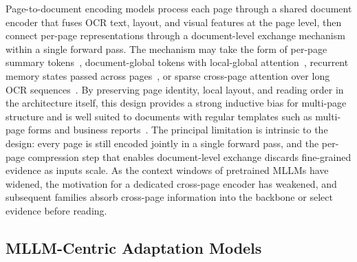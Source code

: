 \documentclass[11pt]{article}
\begin{document}
Page-to-document encoding models process each page through a shared document encoder that fuses OCR text, layout, and visual features at the page level, then connect per-page representations through a document-level exchange mechanism within a single forward pass. The mechanism may take the form of per-page summary tokens~\cite{tito2023hierarchical}, document-global tokens with local-global attention~\cite{blau2024gram}, recurrent memory states passed across pages~\cite{dong2024multipage}, or sparse cross-page attention over long OCR sequences~\cite{borchmann2025arctictilt}. By preserving page identity, local layout, and reading order in the architecture itself, this design provides a strong inductive bias for multi-page structure and is well suited to documents with regular templates such as multi-page forms and business reports~\cite{tito2023hierarchical,borchmann2025arctictilt}. The principal limitation is intrinsic to the design: every page is still encoded jointly in a single forward pass, and the per-page compression step that enables document-level exchange discards fine-grained evidence as inputs scale. As the context windows of pretrained MLLMs have widened, the motivation for a dedicated cross-page encoder has weakened, and subsequent families absorb cross-page information into the backbone or select evidence before reading.

\subsection{MLLM-Centric Adaptation Models}
\label{sec:arch-bc}
\end{document}
